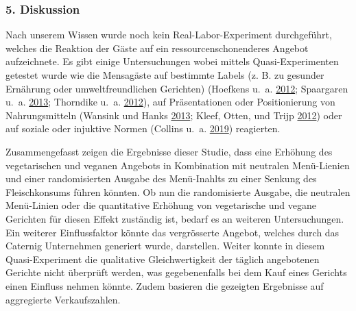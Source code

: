 \documentclass[12pt,ngerman,]{article}
\begin{document}
\newpage

\hypertarget{diskussion}{%
\subsubsection{5. Diskussion}\label{diskussion}}

Nach unserem Wissen wurde noch kein Real-Labor-Experiment durchgeführt,
welches die Reaktion der Gäste auf ein ressourcenschonenderes Angebot
aufzeichnete. Es gibt einige Untersuchungen wobei mittels
Quasi-Experimenten getestet wurde wie die Mensagäste auf bestimmte
Labels (z. B. zu gesunder Ernährung oder umweltfreundlichen Gerichten)
(Hoefkens u.~a. \protect\hyperlink{ref-hoefkens_what_2012}{2012};
Spaargaren u.~a. \protect\hyperlink{ref-spaargaren_consumer_2013}{2013};
Thorndike u.~a. \protect\hyperlink{ref-thorndike_2-phase_2012}{2012}),
auf Präsentationen oder Positionierung von Nahrungsmitteln (Wansink und
Hanks \protect\hyperlink{ref-wansink_slim_2013}{2013}; Kleef, Otten, und
Trijp \protect\hyperlink{ref-van_kleef_healthy_2012}{2012}) oder auf
soziale oder injuktive Normen (Collins u.~a.
\protect\hyperlink{ref-collins_two_2019}{2019}) reagierten.

\par

Zusammengefasst zeigen die Ergebnisse dieser Studie, dass eine Erhöhung
des vegetarischen und veganen Angebots in Kombination mit neutralen
Menü-Lienien und einer randomisierten Ausgabe des Menü-Inahlts zu einer
Senkung des Fleischkonsums führen könnten. Ob nun die randomisierte
Ausgabe, die neutralen Menü-Linien oder die quantitative Erhöhung von
vegetarische und vegane Gerichten für diesen Effekt zuständig ist,
bedarf es an weiteren Untersuchungen. Ein weiterer Einflussfaktor könnte
das vergrösserte Angebot, welches durch das Caternig Unternehmen
generiert wurde, darstellen. Weiter konnte in diesem Quasi-Experiment
die qualitative Gleichwertigkeit der täglich angebotenen Gerichte nicht
überprüft werden, was gegebenenfalls bei dem Kauf eines Gerichts einen
Einfluss nehmen könnte. Zudem basieren die gezeigten Ergebnisse auf
aggregierte Verkaufszahlen.

\par
\end{document}
